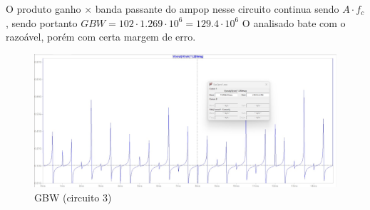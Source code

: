 \documentclass[10pt,twocolumn,letterpaper]{article}
\begin{document}
\newpage
O produto ganho $\times$ banda passante do ampop nesse circuito continua sendo $A\cdot f_c$, sendo portanto $GBW = 102\cdot1.269\cdot10^6=129.4\cdot10^6$ O analisado bate com o razoável, porém com certa margem de erro. 

\begin{figure}[h]
\caption{GBW (circuito 3)}
\begin{center}
\includegraphics[scale=0.15]{figuras/fig15}
\end{center}
\end{figure}



{\small


}
\end{document}
